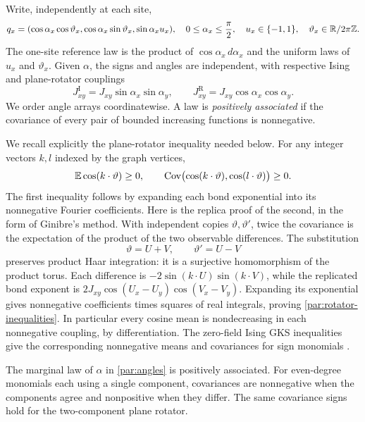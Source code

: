 Write, independently at each site,
\begin{equation}\label{par:angles}
 q_x=(\cos\alpha_x\cos\vartheta_x,
       \cos\alpha_x\sin\vartheta_x,
       \sin\alpha_x u_x),
 \quad 0\le\alpha_x\le\frac\pi2,
 \quad u_x\in\{-1,1\},\quad \vartheta_x\in\mathbb R/2\pi\mathbb Z.
\end{equation}
The one-site reference law is the product of $\cos\alpha_x\,d\alpha_x$
and the uniform laws of $u_x$ and $\vartheta_x$. Given $\alpha$, the signs
and angles are independent, with respective Ising and plane-rotator
couplings
\begin{equation}\label{par:conditional-couplings}
 J^{\mathrm I}_{xy}=J_{xy}\sin\alpha_x\sin\alpha_y,
 \qquad
 J^{\mathrm R}_{xy}=J_{xy}\cos\alpha_x\cos\alpha_y.
\end{equation}
We order angle arrays coordinatewise. A law is \emph{positively associated}
if the covariance of every pair of bounded increasing functions is
nonnegative.

We recall explicitly the plane-rotator inequality needed below. For any
integer vectors $k,l$ indexed by the graph vertices,
\begin{equation}\label{par:rotator-inequalities}
 \mathbb E\cos(k\cdot\vartheta)\ge0,
 \qquad
 \operatorname{Cov}\bigl(\cos(k\cdot\vartheta),
            \cos(l\cdot\vartheta)\bigr)\ge0.
\end{equation}
The first inequality follows by expanding each bond exponential into its
nonnegative Fourier coefficients. Here is the replica proof of the second,
in the form of Ginibre's method. With independent copies $\vartheta,
\vartheta'$, twice the covariance is the expectation of the product of the
two observable differences. The substitution
\[
             \vartheta=U+V,\qquad \vartheta'=U-V
\]
preserves product Haar integration: it is a surjective homomorphism of the
product torus. Each difference is
$-2\sin(k\cdot U)\sin(k\cdot V)$, while the replicated bond exponent is
$2J_{xy}\cos(U_x-U_y)\cos(V_x-V_y)$. Expanding its exponential gives
nonnegative coefficients times squares of real integrals, proving
\eqref{par:rotator-inequalities}. In particular every cosine mean is
nondecreasing in each nonnegative coupling, by differentiation.
The zero-field Ising GKS inequalities give the corresponding nonnegative
means and covariances for sign monomials
\cite{Griffiths1967,KellySherman1968}.

\begin{lemma}\label{par:association}
The marginal law of $\alpha$ in \eqref{par:angles} is positively associated.
For even-degree monomials each using a single component, covariances are
nonnegative when the components agree and nonpositive when they differ.
The same covariance signs hold for the two-component plane rotator.
\end{lemma}

